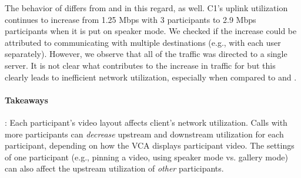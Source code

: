 The behavior of \teams differs from \meet and \zoom in this regard, as well.
C1's uplink utilization continues to increase from 1.25 Mbps with 3
participants to 2.9 Mbps participants when it is put on speaker mode. We
checked if the increase could be attributed to \teams communicating with
multiple destinations (e.g., with each user separately). However, we observe
that all of the traffic was directed to a single server. It is not clear what
contributes to the increase in traffic for \teams but this clearly leads to
inefficient network utilization, especially when compared to \zoom and \meet. 
\vspace{5pt}
\begin{mdframed}[roundcorner=5pt, backgroundcolor=black!10]
    \paragraph{Takeaways}: Each participant's video layout affects client's
    network utilization. Calls with more participants can {\em decrease} upstream and downstream utilization 
    for each participant, depending on how the VCA displays participant video.
    The settings of one participant (e.g., pinning a video, using speaker mode
    vs. gallery mode) can also affect the upstream utilization of {\em other}
    participants.
\end{mdframed}


